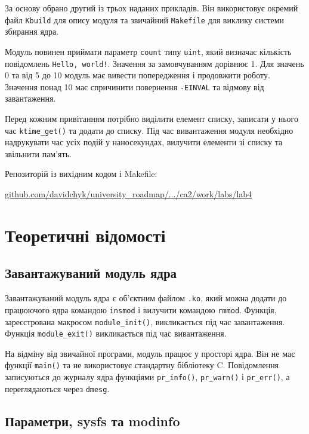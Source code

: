 \documentclass[12pt,a4paper]{article}
\begin{document}
За основу обрано другий із трьох наданих прикладів. Він використовує окремий
файл \texttt{Kbuild} для опису модуля та звичайний \texttt{Makefile} для
виклику системи збирання ядра.

Модуль повинен приймати параметр \texttt{count} типу \texttt{uint}, який
визначає кількість повідомлень \texttt{Hello, world!}. Значення за
замовчуванням дорівнює 1. Для значень 0 та від 5 до 10 модуль має вивести
попередження і продовжити роботу. Значення понад 10 має спричинити повернення
\texttt{-EINVAL} та відмову від завантаження.

Перед кожним привітанням потрібно виділити елемент списку, записати у нього
час \texttt{ktime\_get()} та додати до списку. Під час вивантаження модуля
необхідно надрукувати час усіх подій у наносекундах, вилучити елементи зі
списку та звільнити пам'ять.

Репозиторій із вихідним кодом і Makefile:
\begin{center}
\href{https://github.com/davidchyk/university_roadmap/tree/main/semester5/ca2/work/labs/lab4}{github.com/davidchyk/university\_roadmap/.../ca2/work/labs/lab4}
\end{center}

\section{Теоретичні відомості}

\subsection{Завантажуваний модуль ядра}

Завантажуваний модуль ядра є об'єктним файлом \texttt{.ko}, який можна
додати до працюючого ядра командою \texttt{insmod} і вилучити командою
\texttt{rmmod}. Функція, зареєстрована макросом \texttt{module\_init()},
викликається під час завантаження. Функція \texttt{module\_exit()}
викликається під час вивантаження.

На відміну від звичайної програми, модуль працює у просторі ядра. Він не має
функції \texttt{main()} та не використовує стандартну бібліотеку C.
Повідомлення записуються до журналу ядра функціями \texttt{pr\_info()},
\texttt{pr\_warn()} і \texttt{pr\_err()}, а переглядаються через
\texttt{dmesg}.

\subsection{Параметри, sysfs та modinfo}
\end{document}
